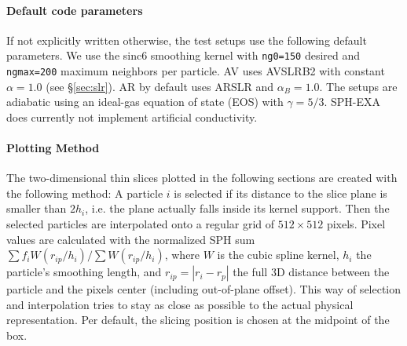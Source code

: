 \paragraph{Default code parameters}
If not explicitly written otherwise, the test setups use the following default parameters. We use the sinc6 smoothing kernel with \texttt{ng0=150} desired and \texttt{ngmax=200} maximum neighbors per particle. AV uses AVSLRB2 with constant $\alpha = 1.0$ (see §\ref{sec:slr}). AR by default uses ARSLR and $\alpha_B=1.0$. The setups are adiabatic using an ideal-gas equation of state (EOS) with $\gamma = 5/3$. SPH-EXA does currently not implement artificial conductivity. 

\paragraph{Plotting Method}
\label{sec:plotting_method}
The two-dimensional thin slices plotted in the following sections are created with the following method: A particle $i$ is selected if its distance to the slice plane is smaller than $2h_i$, i.e. the plane actually falls inside its kernel support. Then the selected particles are interpolated onto a regular grid of $512 \times 512$ pixels. Pixel values are calculated with the normalized SPH sum $ {\sum f_i W(r_{ip}/ h_i)}/{\sum W(r_{ip}/h_i)}$, where $W$ is the cubic spline kernel, $h_i$ the particle's smoothing length, and $r_{ip}=|r_i-r_p|$ the full 3D distance between the particle and the pixels center (including out-of-plane offset). This way of selection and interpolation tries to stay as close as possible to the actual physical representation. Per default, the slicing position is chosen at the midpoint of the box.




